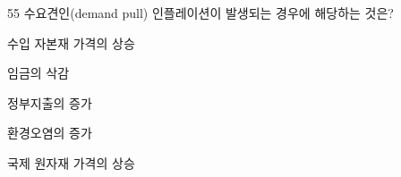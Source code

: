 \begin{question}{55}
수요견인(demand pull) 인플레이션이 발생되는 경우에 해당하는 것은?
\begin{choices}
  \item 수입 자본재 가격의 상승
  \item 임금의 삭감
  \item 정부지출의 증가
  \item 환경오염의 증가
  \item 국제 원자재 가격의 상승
\end{choices}
\end{question}
